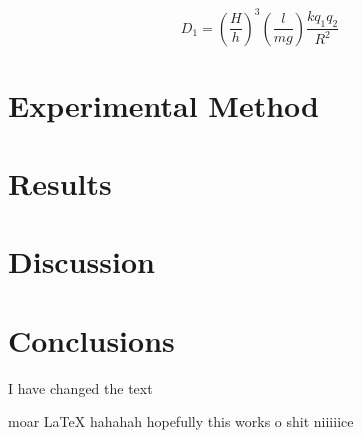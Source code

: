 \documentclass{article}
\begin{document}
\begin{equation}
  D_1=(\frac{H}{h})^3 (\frac{l}{mg}) \frac{k q_1 q_2}{R^2}
\end{equation}

\section{Experimental Method}

\section{Results}

\section{Discussion}

\section{Conclusions}





  \newpage %

  I have changed the text

  moar \LaTeX{}
  hahahah hopefully this works
  o shit
  niiiiice

  \newpage
\end{document}
